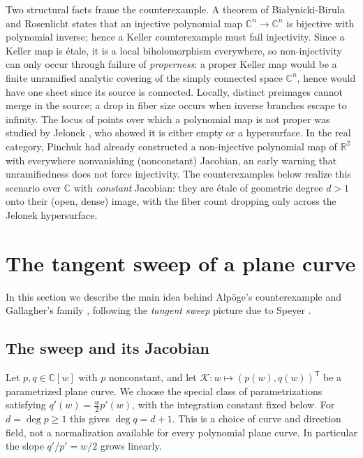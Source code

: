 \documentclass[11pt]{article}
\numberwithin{equation}{section}
\theoremstyle{plain}
\theoremstyle{definition}
\theoremstyle{remark}
\newcommand{\C}{\mathbb{C}}
\begin{document}
Two structural facts frame the counterexample. A theorem of
Bia{\l}ynicki-Birula and Rosenlicht \cite{BBR1962} states that an injective
polynomial map $\C^n\to\C^n$ is bijective with polynomial inverse; hence a Keller
counterexample must fail injectivity. Since a Keller map is \'etale,
it is a local biholomorphism everywhere, so non-injectivity can only occur through
failure of \emph{properness}: a proper Keller map would be a finite
unramified analytic covering of the simply connected space $\C^n$, hence
would have one sheet since its source is connected. Locally, distinct
preimages cannot merge in the source; a drop in fiber size occurs when
inverse branches escape to infinity. The locus of points over which a
polynomial map is not proper was studied by Jelonek \cite{Jelonek1993}, who showed
it is either empty or a hypersurface. In the real category, Pinchuk
\cite{Pinchuk1994} had already constructed a non-injective polynomial map of
$\mathbb{R}^2$ with everywhere nonvanishing (nonconstant) Jacobian, an early
warning that unramifiedness does not force injectivity. The counterexamples below
realize this scenario over $\C$ with \emph{constant} Jacobian: they are \'etale of
geometric degree $d>1$ onto their (open, dense) image, with the fiber count
dropping only across the Jelonek hypersurface.

\section{The tangent sweep of a plane curve}\label{sec:sweep}

In this section we describe the main idea behind Alp\"oge's counterexample and
Gallagher's family \cite{Gallagher2026}, following the \emph{tangent sweep}
picture due to Speyer \cite{Speyer2026}.

\subsection{The sweep and its Jacobian}
Let $p,q\in\C[w]$ with $p$ nonconstant, and let
$\mathcal{K}\colon w\mapsto(p(w),q(w))^{\mathsf T}$ be a parametrized plane curve.
We choose the special class of parametrizations satisfying
$q'(w)=\tfrac{w}{2}p'(w)$, with the integration constant fixed below.
For $d=\deg p\ge1$ this gives $\deg q=d+1$. This is a choice of curve
and direction field, not a normalization available for every polynomial
plane curve. In particular the slope $q'/p'=w/2$ grows linearly.
\end{document}
